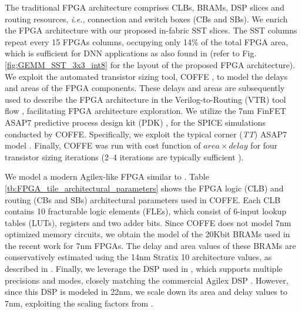 The traditional FPGA architecture comprises 
CLBs, BRAMs, DSP slices and routing resources, \emph{i.e.,} connection and switch boxes (CBs and SBs).
We enrich the FPGA architecture with our proposed in-fabric SST slices.
The SST columns repeat every 15 FPGAs columns, occupying only 14\% of the total FPGA area, which is sufficient for DNN applications as also found in \cite{Aman_TS_TRETS_2022} (refer to Fig. \ref{fig:GEMM_SST_3x3_int8} for the layout of the proposed FPGA architecture).
We exploit the automated transistor sizing tool, COFFE \cite{3D_FPGAs_COFFE_Boutros_FPT23, COFFE2_TRETS_2019}, to model the delays and areas of the FPGA components. 
These delays and areas are subsequently used to describe the FPGA architecture in the Verilog-to-Routing (VTR) tool flow \cite{VTR_8_2020}, facilitating FPGA architecture exploration.
We utilize the 7nm FinFET ASAP7 predictive process design kit (PDK) \cite{ASAP7_2016}, for the SPICE simulations conducted by COFFE.
Specifically, we exploit the typical corner (\emph{TT}) ASAP7 model \cite{ASAP7_2016, ASAP7_invited_2017}. 
Finally, COFFE was run with cost function of $area \times delay$ for four transistor sizing iterations (2--4 iterations are typically sufficient 
\cite{Original_COFFE_2013}).

We model a modern Agilex-like FPGA similar to \cite{TS_Aman_FPGA_2021, Aman_TS_TRETS_2022}.
Table \ref{tb:FPGA_tile_architectural_parameters} shows the FPGA logic (CLB) and routing (CBs and SBs) architectural parameters used in COFFE.
Each CLB contains 10 fracturable logic elements (FLEs), which consist of 6-input lookup tables (LUTs), registers and two adder bits.
Since COFFE does not model 7nm optimized memory circuits, we obtain the model of the 20Kbit BRAMs used in the recent work \cite{3D_FPGAs_COFFE_Boutros_FPT23} for 7nm FPGAs.
The delay and area values of these BRAMs are conservatively estimated using the 14nm Stratix 10 architecture values, as described in \cite{3D_FPGAs_COFFE_Boutros_FPT23}. 
Finally, we leverage the DSP used in \cite{Aman_TS_TRETS_2022}, which supports multiple precisions and modes, closely matching the commercial Agilex DSP \cite{Intel_Agilex_DSP_2020}.
However, since this DSP is modeled in 22nm, we scale down its area and delay values to 7nm, exploiting the scaling factors from \cite{Scale_VLSI_2017}.






